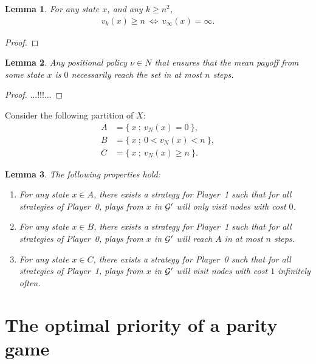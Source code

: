 \documentclass{article}
\newtheorem{lemma}{Lemma}
\def\G{{\cal G}}
\def\pa{Player~0}
\def\pb{Player~1}
\begin{document}
\begin{lemma}
  For any state $x$, and any $k \ge n^2$,
  \begin{align}
    v_k(x) \ge n ~\Longleftrightarrow~ v_\infty(x)=\infty.
  \end{align}
\end{lemma}
\begin{proof}

\end{proof}


\begin{lemma}
  Any positional policy $\nu \in N$ that ensures that the mean payoff from some state $x$ is $0$ necessarily reach the set in at most $n$ steps.
\end{lemma}
\begin{proof}
...!!!...
\end{proof}



Consider the following partition of $X$:
\begin{align}
  A & = \{~ x ~;~ v_N(x)=0 ~\}, \\
  B &= \{~ x ~;~ 0 < v_N(x) < n ~\}, \\
  C &= \{~ x ~;~ v_N(x) \ge n ~\}.
\end{align}
\begin{lemma}
  The following properties hold:
  \begin{enumerate}
  \item For any state $x \in A$, there exists a strategy for \pb{ }such that for all strategies of \pa, plays from $x$ in $\G'$ will only visit nodes with cost $0$.
  \item For any state $x \in B$, there exists a strategy for \pb{ }such that for all strategies of \pa, plays from $x$ in $\G'$ will reach $A$ in at most $n$ steps. 
  \item For any state $x \in C$, there exists a strategy for \pa{ }such that for all strategies of \pb, plays from $x$ in $\G'$ will visit nodes with cost $1$ infinitely often.
  \end{enumerate}
\end{lemma}



\section{The optimal priority of a parity game}
\end{document}
